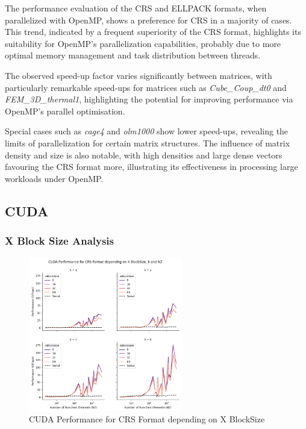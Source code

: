 \documentclass[12pt,oneside]{book} %
\begin{document}
The performance evaluation of the CRS and ELLPACK formats, when parallelized
with OpenMP, shows a preference for CRS in a majority of cases. This trend,
indicated by a frequent superiority of the CRS format, highlights its
suitability for OpenMP's parallelization capabilities, probably due to more
optimal memory management and task distribution between threads.

The observed speed-up factor varies significantly between matrices, with
particularly remarkable speed-ups for matrices such as \textit{Cube\_Coup\_dt0}
and \textit{FEM\_3D\_thermal1}, highlighting the potential for improving
performance via OpenMP's parallel optimisation.

Special cases such as \textit{cage4} and \textit{olm1000} show lower speed-ups,
revealing the limits of parallelization for certain matrix structures. The
influence of matrix density and size is also notable, with high densities and
large dense vectors favouring the CRS format more, illustrating its
effectiveness in processing large workloads under OpenMP.

\subsection{CUDA}

\subsubsection{X Block Size Analysis}

\begin{figure}[H]
    \centering
    \includegraphics[width=0.6\textwidth]{../results/images/CUDA_xBlockSize_CRS.png}
    \caption{CUDA Performance for CRS Format depending on X BlockSize}
    \label{fig:cudaxblocksizecrs}
\end{figure}
\end{document}
